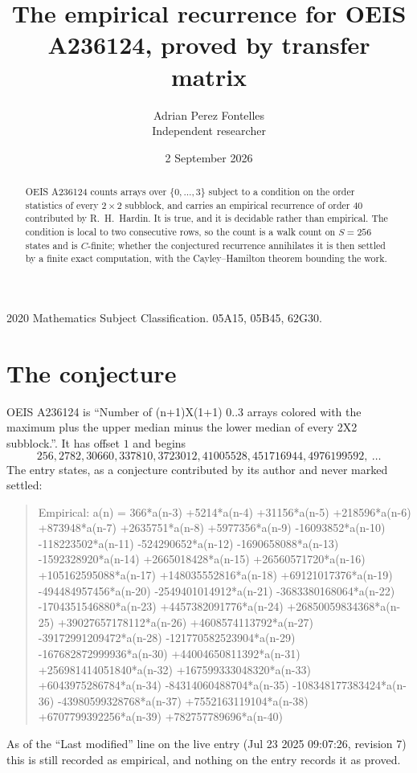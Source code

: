 \documentclass[11pt,a4paper]{article}
\title{The empirical recurrence for OEIS A236124, proved by transfer matrix}
\author{Adrian Perez Fontelles\\ \small Independent researcher}
\date{2 September 2026}
\theoremstyle{plain}
\theoremstyle{definition}
\begin{document}
\maketitle

\begin{abstract}
OEIS A236124 counts arrays over $\{0,\dots,3\}$ subject to a condition on the order
statistics of every $2\times2$ subblock, and carries an empirical recurrence of order
$40$ contributed by R.~H.~Hardin. It is true, and it is decidable rather than empirical.
The condition is local to two consecutive rows, so the count is a walk count on $S=256$
states and is $C$-finite; whether the conjectured recurrence annihilates it is then settled by
a finite exact computation, with the Cayley--Hamilton theorem bounding the work.
\end{abstract}

\noindent\small 2020 Mathematics Subject Classification. 05A15, 05B45, 62G30.\normalsize

\section{The conjecture}

OEIS A236124 is ``Number of (n+1)X(1+1) 0..3 arrays colored with the maximum plus the upper median minus the lower median of every 2X2 subblock.''. It has offset $1$ and begins
\[
256, 2782, 30660, 337810, 3723012, 41005528, 451716944, 4976199592,\ \dots
\]
The entry states, as a conjecture contributed by its author and never marked settled:
\begin{quote}
Empirical: a(n) = 366*a(n-3) +5214*a(n-4) +31156*a(n-5) +218596*a(n-6) +873948*a(n-7) +2635751*a(n-8) +5977356*a(n-9) -16093852*a(n-10) -118223502*a(n-11) -524290652*a(n-12) -1690658088*a(n-13) -1592328920*a(n-14) +2665018428*a(n-15) +26560571720*a(n-16) +105162595088*a(n-17) +148035552816*a(n-18) +69121017376*a(n-19) -494484957456*a(n-20) -2549401014912*a(n-21) -3683380168064*a(n-22) -1704351546880*a(n-23) +4457382091776*a(n-24) +26850059834368*a(n-25) +39027657178112*a(n-26) +4608574113792*a(n-27) -39172991209472*a(n-28) -121770582523904*a(n-29) -167682872999936*a(n-30) +44004650811392*a(n-31) +256981414051840*a(n-32) +167599333048320*a(n-33) +6043975286784*a(n-34) -84314060488704*a(n-35) -108348177383424*a(n-36) -43980599328768*a(n-37) +7552163119104*a(n-38) +6707799392256*a(n-39) +782757789696*a(n-40)
\end{quote}
As of the ``Last modified'' line on the live entry (Jul 23 2025 09:07:26, revision 7) this is still
recorded as empirical, and nothing on the entry records it as proved.
\end{document}
